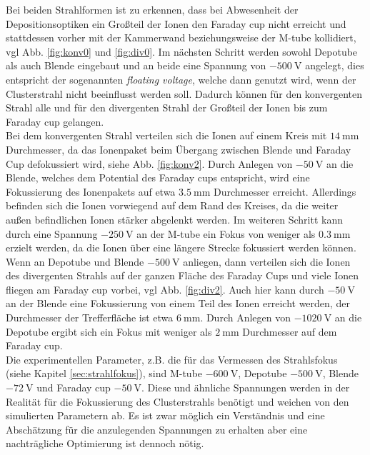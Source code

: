 Bei beiden Strahlformen ist zu erkennen, dass bei Abwesenheit der Depositionsoptiken ein Großteil der Ionen den Faraday cup nicht erreicht und stattdessen vorher mit der Kammerwand beziehungsweise der M-tube kollidiert, vgl Abb. \ref{fig:konv0} und \ref{fig:div0}.
Im nächsten Schritt werden sowohl Depotube als auch Blende eingebaut und an beide eine Spannung von $\SI{-500}{\volt}$ angelegt, dies entspricht der sogenannten \textit{floating voltage}, welche dann genutzt wird, wenn der Clusterstrahl nicht beeinflusst werden soll.
Dadurch können für den konvergenten Strahl alle und für den divergenten Strahl der Großteil der Ionen bis zum Faraday cup gelangen.\\

Bei dem konvergenten Strahl verteilen sich die Ionen auf einem Kreis mit $\SI{14}{\mm}$ Durchmesser, da das Ionenpaket beim Übergang zwischen Blende und Faraday Cup defokussiert wird, siehe Abb. \ref{fig:konv2}.
Durch Anlegen von $\SI{-50}{\volt}$ an die Blende, welches dem Potential des Faraday cups entspricht, wird eine Fokussierung des Ionenpakets auf etwa $\SI{3,5}{\mm}$ Durchmesser erreicht.
Allerdings befinden sich die Ionen vorwiegend auf dem Rand des Kreises, da die weiter außen befindlichen Ionen stärker abgelenkt werden.
Im weiteren Schritt kann durch eine Spannung $\SI{-250}{\volt}$ an der M-tube ein Fokus von weniger als $\SI{0,3}{\mm}$ erzielt werden, da die Ionen über eine längere Strecke fokussiert werden können.\\

Wenn an Depotube und Blende $\SI{-500}{\volt}$ anliegen, dann verteilen sich die Ionen des divergenten Strahls auf der ganzen Fläche des Faraday Cups und viele Ionen fliegen am Faraday cup vorbei, vgl Abb. \ref{fig:div2}.
Auch hier kann durch $\SI{-50}{\volt}$ an der Blende eine Fokussierung von einem Teil des Ionen erreicht werden, der Durchmesser der Trefferfläche ist etwa $\SI{6}{\mm}$.
Durch Anlegen von $\SI{-1020}{\volt}$ an die Depotube ergibt sich ein Fokus mit weniger als $\SI{2}{\mm}$ Durchmesser auf dem Faraday cup.\\

Die experimentellen Parameter, z.B. die für das Vermessen des Strahlsfokus (siehe Kapitel \ref{sec:strahlfokus}), sind M-tube $\SI{-600}{\volt}$, Depotube $\SI{-500}{\volt}$, Blende $\SI{-72}{\volt}$ und Faraday cup $\SI{-50}{\volt}$.
Diese und ähnliche Spannungen werden in der Realität für die Fokussierung des Clusterstrahls benötigt und weichen von den simulierten Parametern ab.
Es ist zwar möglich ein Verständnis und eine Abschätzung für die anzulegenden Spannungen zu erhalten aber eine nachträgliche Optimierung ist dennoch nötig.


